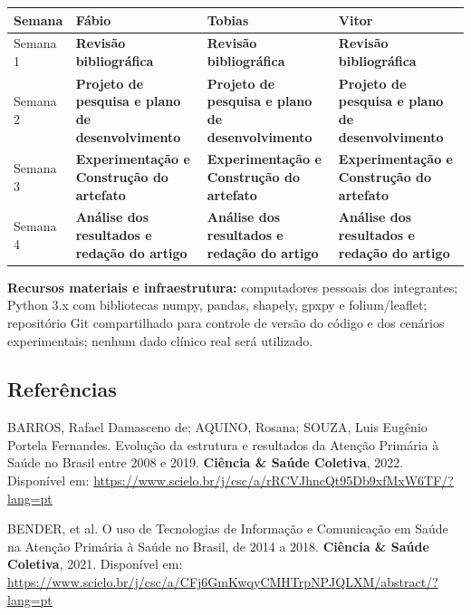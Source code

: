 \documentclass[11pt,a4paper]{article}
\newcounter{none} %
\begin{document}
{\def\LTcaptype{none} %
\begin{longtable}[]{@{}>{\raggedright\arraybackslash}p{}>{\raggedright\arraybackslash}p{}>{\raggedright\arraybackslash}p{}>{\raggedright\arraybackslash}p{}@{}}
\toprule\noalign{}
Semana & Fábio & Tobias & Vitor \\
\midrule\noalign{}
\endhead%
\bottomrule\noalign{}
\endlastfoot%
Semana 1 & \textbf{Revisão bibliográfica} & \textbf{Revisão
bibliográfica} & \textbf{Revisão bibliográfica} \\
Semana 2 & \textbf{Projeto de pesquisa e plano de desenvolvimento} &
\textbf{Projeto de pesquisa e plano de desenvolvimento} &
\textbf{Projeto de pesquisa e plano de desenvolvimento} \\
Semana 3 & \textbf{Experimentação e Construção do artefato} &
\textbf{Experimentação e Construção do artefato} &
\textbf{Experimentação e Construção do artefato} \\
Semana 4 & \textbf{Análise dos resultados e redação do artigo} &
\textbf{Análise dos resultados e redação do artigo} & \textbf{Análise
dos resultados e redação do artigo} \\
\end{longtable}
}

\textbf{Recursos materiais e infraestrutura:} computadores pessoais dos
integrantes; Python 3.x com bibliotecas numpy, pandas, shapely, gpxpy e
folium/leaflet; repositório Git compartilhado para controle de versão do
código e dos cenários experimentais; nenhum dado clínico real será
utilizado.

\subsection{Referências}\label{referuxeancias}

BARROS, Rafael Damasceno de; AQUINO, Rosana; SOUZA, Luis Eugênio Portela
Fernandes. Evolução da estrutura e resultados da Atenção Primária à
Saúde no Brasil entre 2008 e 2019. \textbf{Ciência \& Saúde Coletiva},
2022. Disponível em:
\url{https://www.scielo.br/j/csc/a/rRCVJhncQt95Db9xfMxW6TF/?lang=pt}

BENDER, et al. O uso de Tecnologias de Informação e Comunicação em Saúde
na Atenção Primária à Saúde no Brasil, de 2014 a 2018. \textbf{Ciência
\& Saúde Coletiva}, 2021. Disponível em:
\url{https://www.scielo.br/j/csc/a/CFj6GmKwqyCMHTrpNPJQLXM/abstract/?lang=pt}
\end{document}
